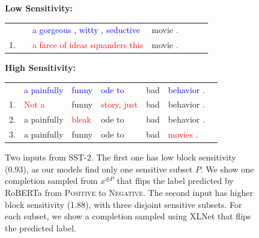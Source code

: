 \documentclass[11pt,a4paper]{article}
\begin{document}
\begin{figure}
        \textbf{Low Sensitivity:}
        
\setlength{\tabcolsep}{0.15em}
            \begin{tabular}{lllllll} %
      &  &    \textcolor{blue}{a gorgeous , witty , seductive} & movie . \\
         1.& & \textcolor{red}{a farce of ideas squanders this} & movie . \\
        \end{tabular}
        
        \textbf{High Sensitivity:}
        
\setlength{\tabcolsep}{0.15em}
        \begin{tabular}{lllllll} %
        & \textcolor{blue}{a painfully} & \textcolor{blue}{funny} & \textcolor{blue}{ode to} & bad & \textcolor{blue}{behavior} . \\
        1. & \textcolor{red}{Not a} & funny & \textcolor{red}{story, just} & bad & behavior . \\
        2. & a painfully & \textcolor{red}{bleak} & ode to & bad & behavior . \\
        3. & a painfully &funny& ode to & bad & \textcolor{red}{movies} . \\
        \end{tabular}
    
     
    \caption{Two inputs from SST-2.
	The first one has low block sensitivity (0.93), as our models find only one sensitive subset $P$.
	We show one completion sampled from $x^{\oplus P}$ that flips the label predicted by RoBERTa from \textsc{Positive} to \textsc{Negative}.
	The second input has higher block sensitivity (1.88), with three disjoint sensitive subsets.
	For each subset, we show a completion sampled using XLNet that flips the predicted label. 
    }
    \label{fig:ex-sst2}
\end{figure}
\end{document}
